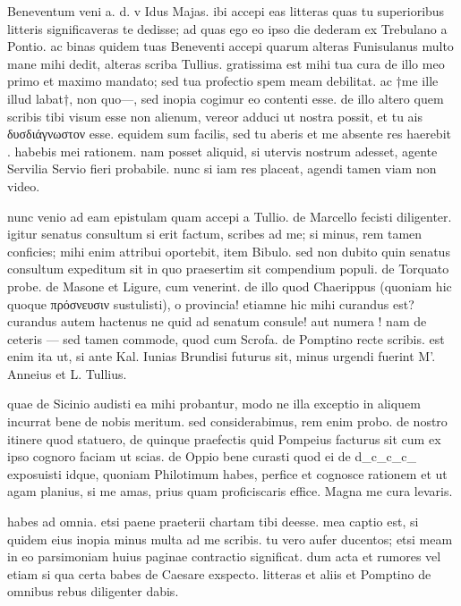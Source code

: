


 Beneventum veni a. d. v Idus Majas. ibi accepi eas litteras quas tu superioribus litteris significaveras te dedisse; ad quas ego eo ipso die dederam ex Trebulano a Pontio. ac binas quidem tuas Beneventi accepi quarum alteras Funisulanus multo mane mihi dedit, alteras scriba Tullius. gratissima est mihi tua cura de illo meo primo et maximo mandato; sed tua profectio spem meam debilitat. ac †me ille illud labat†, non quo—, sed inopia cogimur eo contenti esse. de illo altero quem scribis tibi visum esse non alienum, vereor adduci ut nostra possit, et tu ais δυσδιάγνωστον esse. equidem sum facilis, sed tu aberis et me absente res haerebit . habebis mei rationem. nam posset aliquid, si utervis nostrum adesset, agente Servilia Servio fieri probabile. nunc si iam res placeat, agendi tamen viam non video.

 nunc venio ad eam epistulam quam accepi a Tullio. de Marcello fecisti diligenter. igitur senatus consultum si erit factum, scribes ad me; si minus, rem tamen conficies; mihi enim attribui oportebit, item Bibulo. sed non dubito quin senatus consultum expeditum sit in quo praesertim sit compendium populi. de Torquato probe. de Masone et Ligure, cum venerint. de illo quod Chaerippus (quoniam hic quoque πρόσνευσιν sustulisti), o provincia! etiamne hic mihi curandus est? curandus autem hactenus ne quid ad senatum consule! aut numera ! nam de ceteris — sed tamen commode, quod cum Scrofa. de Pomptino recte scribis. est enim ita ut, si ante Kal. Iunias Brundisi futurus sit, minus urgendi fuerint M'. Anneius et L. Tullius.

 quae de Sicinio audisti ea mihi probantur, modo ne illa exceptio in aliquem incurrat bene de nobis meritum. sed considerabimus, rem enim probo. de nostro itinere quod statuero, de quinque praefectis quid Pompeius facturus sit cum ex ipso cognoro faciam ut scias. de Oppio bene curasti quod ei de d_c_c_c_ exposuisti idque, quoniam Philotimum habes, perfice et cognosce rationem et ut agam planius, si me amas, prius quam proficiscaris effice. Magna me cura levaris.

 habes ad omnia. etsi paene praeterii chartam tibi deesse. mea captio est, si quidem eius inopia minus multa ad me scribis. tu vero aufer ducentos; etsi meam in eo parsimoniam huius paginae contractio significat. dum acta et rumores vel etiam si qua certa babes de Caesare exspecto. litteras et aliis et Pomptino de omnibus rebus diligenter dabis.

